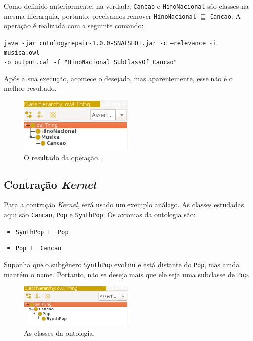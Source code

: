 Como definido anteriormente, na verdade, \texttt{Cancao} e \texttt{HinoNacional} são classes na mesma hierarquia, portanto, precisamos remover \texttt{HinoNacional} $ \sqsubseteq $ \texttt{Cancao}. A operação é realizada com o seguinte comando:

\begin{small}
	\texttt{java -jar ontologyrepair-1.0.0-SNAPSHOT.jar -c --relevance -i musica.owl \\ -o output.owl -f "HinoNacional SubClassOf Cancao"}
\end{small}

Após a sua execução, acontece o desejado, mas aparentemente, esse não é o melhor resultado.

\begin{figure}[H]
	\centering
	\includegraphics[width=0.5\textwidth]{Capitulos/Implementacao/cpm2.png}
	\caption{O resultado da operação.}
\end{figure}

\subsection{Contração \textit{Kernel}}

Para a contração \textit{Kernel}, será usado um exemplo análogo. As classes estudadas aqui são \texttt{Cancao}, \texttt{Pop} e \texttt{SynthPop}. Os axiomas da ontologia são:

\begin{itemize}
	\item \texttt{SynthPop} $ \sqsubseteq $ \texttt{Pop}
	\item \texttt{Pop} $ \sqsubseteq $ \texttt{Cancao}
\end{itemize}

Suponha que o subgênero \texttt{SynthPop} evoluiu e está distante do \texttt{Pop}, mas ainda mantém o nome. Portanto, não se deseja mais que ele seja uma subclasse de \texttt{Pop}.

\begin{figure}[H]
	\centering
	\includegraphics[width=0.5\textwidth]{Capitulos/Implementacao/ck1.png}
	\caption{As classes da ontologia.}
\end{figure}

